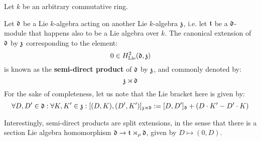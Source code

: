         \begin{example}
            Let $k$ be an arbitrary commutative ring. 
            
            Let $\mathfrak{d}$ be a Lie $k$-algebra acting on another Lie $k$-algebra $\mathfrak{z}$, i.e. let $\mathfrak{t}$ be a $\mathfrak{d}$-module that happens also to be a Lie algebra over $k$. The canonical extension of $\mathfrak{d}$ by $\mathfrak{z}$ corresponding to the element:
                $$0 \in H^2_{\mathrm{Lie}}(\mathfrak{d}, \mathfrak{z})$$
            is known as the \textbf{semi-direct product} of $\mathfrak{d}$ by $\mathfrak{z}$, and commonly denoted by:
                $$\mathfrak{z} \rtimes \mathfrak{d}$$
            For the sake of completeness, let us note that the Lie bracket here is given by:
                $$\forall D, D' \in \mathfrak{d}: \forall K, K' \in \mathfrak{z}: [ (D, K), (D', K') ]_{\mathfrak{z} \rtimes \mathfrak{d}} := [D, D']_{\mathfrak{d}} + ( D \cdot K' - D' \cdot K )$$
            
            Interestingly, semi-direct products are split extensions, in the sense that there is a section Lie algebra homomorphism $\mathfrak{d} \to \mathfrak{t} \rtimes_{\rho} \mathfrak{d}$, given by $D \mapsto (0, D)$.
        \end{example}

